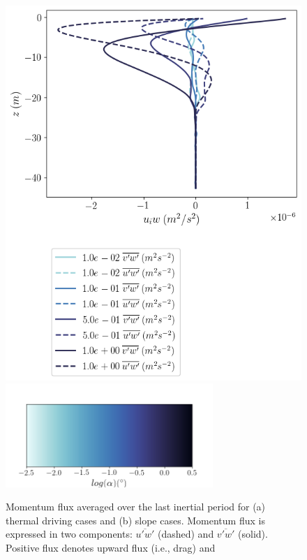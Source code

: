\documentclass[draft]{agujournal2019}
\begin{document}
\begin{figure}[h!]
\begin{minipage}{0.5\textwidth}
        \includegraphics[trim={0 7.5cm 0 0},clip,width=\textwidth]{Figures/momflux_cmp_dslope_46h_tav12_z_profile.png}
        \centering \includegraphics[width=0.7\textwidth,trim={1cm 0cm 1cm 5cm}, clip]{Figures/colorbar_slope.png}
    \end{minipage}
    \caption{Momentum flux averaged over the last inertial period for (a) thermal driving cases and (b) slope cases. Momentum flux is expressed in two components:  $\overline{u'w'}$ (dashed) and $\overline{v'w'}$ (solid). Positive flux denotes upward flux (i.e., drag) and }
    \label{fig:momflux_profiles}
\end{figure}
\end{document}
